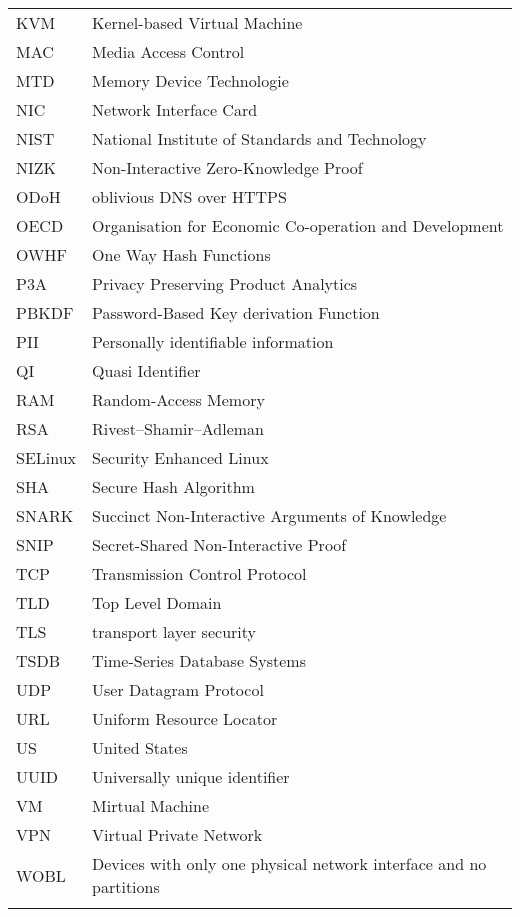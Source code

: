 \begin{longtable}{ p{}  p{} }
KVM & Kernel-based Virtual Machine\\
MAC & Media Access Control\\
MTD & Memory Device Technologie\\                                                   
NIC & Network Interface Card\\                                                      
NIST &  National Institute of Standards and Technology\\                            
NIZK &  Non-Interactive Zero-Knowledge Proof\\                                      
ODoH &  oblivious DNS over HTTPS\\
OECD & Organisation for Economic Co-operation and Development\\
OWHF &  One Way Hash Functions\\
P3A & Privacy Preserving Product Analytics \\
PBKDF & Password-Based Key derivation Function\\                                    
PII & Personally identifiable information\\                                      
QI &    Quasi Identifier\\
RAM & Random-Access Memory\\
RSA & Rivest–Shamir–Adleman\\
SELinux & Security Enhanced Linux\\
SHA & Secure Hash Algorithm\\
SNARK & Succinct Non-Interactive Arguments of Knowledge\\                           
SNIP &  Secret-Shared Non-Interactive Proof\\
TCP & Transmission Control Protocol\\
TLD & Top Level Domain\\                                                            
TLS & transport layer security\\
TSDB &  Time-Series Database Systems\\
UDP & User Datagram Protocol\\
URL & Uniform Resource Locator\\
US &    United States\\
UUID & Universally unique identifier\\
VM &    Mirtual Machine\\
VPN & Virtual Private Network\\
WOBL &  Devices with only one physical network interface and no  partitions\\
&  
\end{longtable}
